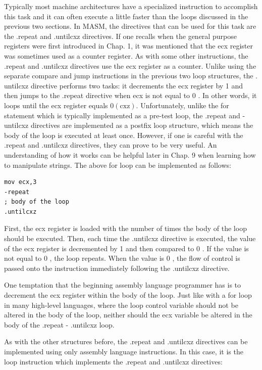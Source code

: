 \documentclass[10pt]{book}
\begin{document}
Typically most machine architectures have a specialized instruction to accomplish this task and it can often execute a little faster than the loops discussed in the previous two sections. In MASM, the directives that can be used for this task are the .repeat and .untilcxz directives. If one recalls when the general purpose registers were first introduced in Chap. 1, it was mentioned that the ecx register was sometimes used as a counter register. As with some other instructions, the .repeat and .untilcxz directives use the ecx register as a counter. Unlike using the separate compare and jump instructions in the previous two loop structures, the . untilcxz directive performs two tasks: it decrements the ecx register by 1 and then jumps to the .repeat directive when ecx is not equal to 0 . In other words, it loops until the ecx register equals $0(\mathrm{cxz})$. Unfortunately, unlike the for statement which is typically implemented as a pre-test loop, the .repeat and -untilcxz directives are implemented as a postfix loop structure, which means the body of the loop is executed at least once. However, if one is careful with the .repeat and .untilcxz directives, they can prove to be very useful. An understanding of how it works can be helpful later in Chap. 9 when learning how to manipulate strings. The above for loop can be implemented as follows:

\begin{verbatim}
mov ecx,3
-repeat
; body of the loop
.untilcxz
\end{verbatim}

First, the ecx register is loaded with the number of times the body of the loop should be executed. Then, each time the .untilcxz directive is executed, the value of the ecx register is decremented by 1 and then compared to 0 . If the value is not equal to 0 , the loop repeats. When the value is 0 , the flow of control is passed onto the instruction immediately following the .untilcxz directive.


One temptation that the beginning assembly language programmer has is to decrement the ecx register within the body of the loop. Just like with a for loop in many high-level languages, where the loop control variable should not be altered in the body of the loop, neither should the ecx variable be altered in the body of the .repeat - .untilcxz loop.

As with the other structures before, the .repeat and .untilcxz directives can be implemented using only assembly language instructions. In this case, it is the loop instruction which implements the .repeat and .untilcxz directives:
\end{document}
